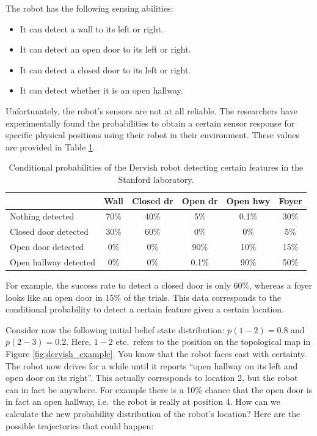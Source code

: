 The robot has the following sensing abilities:
\begin{itemize}
\item It can detect a wall to its left or right.
\item It can detect an open door to its left or right.
\item It can detect a closed door to its left or right.
\item It can detect whether it is an open hallway.
\end{itemize}

Unfortunately, the robot's sensors are not at all reliable. The researchers have experimentally found the probabilities to obtain a certain sensor response for specific physical positions using their robot in their environment. These values are provided in Table \ref{tab:dervish_example}. 

\begin{table}
\footnotesize
\begin{tabular}{lccccc}
 	& Wall	& Closed dr & Open dr	& Open hwy & Foyer\\
\hline
Nothing detected	& 70\%	& 40\%&	5\%	& 0.1\% & 30\%\\
Closed door detected & 30\% &	60\%& 0\% &0\%	& 5\%\\
Open door detected & 0\%	& 0\%&	90\% & 10\% & 15\%\\
Open hallway detected & 0\% &	 0\%&	0.1\% & 90\% &50\%\\
\hline
\end{tabular}
\normalsize
\caption{Conditional probabilities of the Dervish robot detecting certain features in the Stanford laboratory.\label{tab:dervish_example}}
\end{table}

For example, the success rate to detect a closed door is only 60\%, whereas a foyer looks like an open door in 15\% of the trials. This data corresponds to the conditional probability to detect a certain feature given a certain location.

Consider now the following initial belief state distribution: $p(1-2)=0.8$ and $p(2-3)=0.2$. Here, $1-2$ etc.\ refers to the position on the topological map in Figure \ref{fig:dervish_example}. You know that the robot faces east with certainty. The robot now drives for a while until it reports ``open hallway on its left and open door on its right''. This actually corresponds to location 2, but the robot can in fact be anywhere. For example there is a 10\% chance that the open door is in fact an open hallway, i.e.\ the robot is really at position 4. How can we calculate the new probability distribution of the robot's location? Here are the possible trajectories that could happen:

